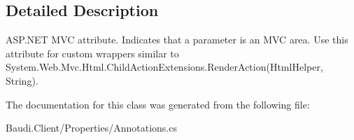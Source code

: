 \subsection{Detailed Description}
A\+S\+P.\+N\+E\+T M\+V\+C attribute. Indicates that a parameter is an M\+V\+C area. Use this attribute for custom wrappers similar to {\ttfamily System.\+Web.\+Mvc.\+Html.\+Child\+Action\+Extensions.\+Render\+Action(\+Html\+Helper, String)}. 



The documentation for this class was generated from the following file\+:\begin{DoxyCompactItemize}
\item 
Baudi.\+Client/\+Properties/Annotations.\+cs\end{DoxyCompactItemize}
